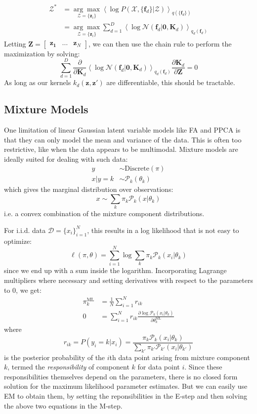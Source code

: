 \documentclass[a4paper]{article}
\begin{document}
\begin{align*}
\mathcal{Z}^* &= \underset{\mathcal{Z}=\{\mathbf{z}_i\}}{\arg\max} \left\langle \log P(\mathcal{X},\{\mathbf{f}_d\}|\mathcal{Z}) \right\rangle_{q(\{\mathbf{f}_d\})} \\
&= \underset{\mathcal{Z}=\{\mathbf{z}_i\}}{\arg\max} \sum_{d=1}^D \left\langle \log \mathcal{N}(\mathbf{f}_d|\mathbf{0},\mathbf{K}_d) \right\rangle_{q_d(\mathbf{f}_d)}
\end{align*}
Letting $\mathbf{Z} = \begin{bmatrix} \mathbf{z_1} & \ldots & \mathbf{z}_N \end{bmatrix}$, we can then use the chain rule to perform the maximization by solving:
\[ \sum_{d=1}^D \frac{\partial}{\partial \mathbf{K}_d} \left\langle \log \mathcal{N}(\mathbf{f}_d|\mathbf{0},\mathbf{K}_d) \right\rangle_{q_d(\mathbf{f}_d)} \frac{\partial \mathbf{K}_d}{\partial\mathbf{Z}} = 0 \]
As long as our kernels $k_d(\mathbf{z},\mathbf{z}')$ are differentiable, this should be tractable.

\subsection{Mixture Models}
One limitation of linear Gaussian latent variable models like FA and PPCA is that they can only model the mean and variance of the data. This is often too restrictive, like when the data appears to be multimodal. Mixture models are ideally suited for dealing with such data:
\begin{align*}
y &\sim \textrm{Discrete}(\pi) \\
x|y=k &\sim \mathcal{P}_k(\theta_k)
\end{align*}
which gives the marginal distribution over observations:
\[ x \sim \sum_k \pi_k\mathcal{P}_k(x|\theta_k)\]
i.e. a convex combination of the mixture component distributions. 

For i.i.d. data $\mathcal{D} = \{x_i\}_{i=1}^N$, this results in a log likelihood that is not easy to optimize:
\[\ell(\pi,\theta) = \sum_{i=1}^N\log\sum_k \pi_k\mathcal{P}_k(x_i|\theta_k)\]
since we end up with a sum inside the logarithm. Incorporating Lagrange multipliers where necessary and setting derivatives with respect to the parameters to 0, we get:
\begin{align*}
\pi_k^\textrm{ML} &= \frac{1}{N}\sum_{i=1}^N r_{ik} \\
0 &= \sum_{i=1}^N r_{ik}\frac{\partial \log\mathcal{P}_k(x_i|\theta_k)}{\partial \theta_k^\textrm{ML}}
\end{align*}
where
\[r_{ik} = P(y_i = k|x_i) = \frac{\pi_k\mathcal{P}_k(x_i|\theta_k)}{\sum_{k'} \pi_{k'}\mathcal{P}_{k'}(x_i|\theta_{k'})}\]
is the posterior probability of the $i$th data point arising from mixture component $k$, termed the \emph{responsibility} of component $k$ for data point $i$. Since these responsibilities themselves depend on the parameters, there is no closed form solution for the maximum likelihood parameter estimates. But we can easily use EM to obtain them, by setting the reponsibilities in the E-step and then solving the above two equations in the M-step.
\end{document}
